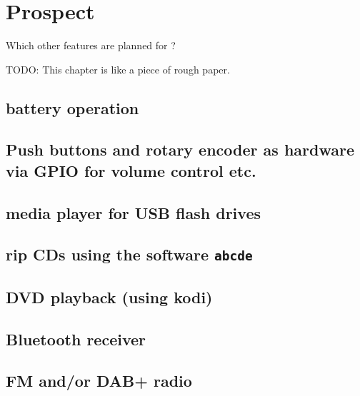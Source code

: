 \chapter{Prospect}

Which other features are planned for {\Bezeichnung}?

TODO: 
This chapter is like a piece of rough paper.

\section{battery operation}
\section{Push buttons and rotary encoder as hardware via GPIO for volume control etc.}
\section{media player for USB flash drives}
\section{rip CDs using the software \texttt{abcde}}
\section{DVD playback (using kodi)}
\section{Bluetooth receiver}
\section{FM and/or DAB+ radio}
